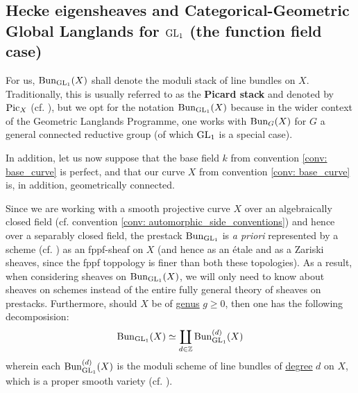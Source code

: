     \subsection{Hecke eigensheaves and Categorical-Geometric Global Langlands for \texorpdfstring{$\operatorname{GL}_1$}{} (the function field case)}
        \begin{convention} \label{conv: automorphic_side_conventions}
            For us, $\mathrm{Bun}_{\operatorname{GL}_1}(X)$ shall denote the moduli stack of line bundles on $X$. Traditionally, this is usually referred to as the \textbf{Picard stack} and denoted by $\mathrm{Pic}_X$ (cf. \cite[\href{https://stacks.math.columbia.edu/tag/0372}{Tag 0372}]{stacks}), but we opt for the notation $\mathrm{Bun}_{\operatorname{GL}_1}(X)$ because in the wider context of the Geometric Langlands Programme, one works with $\mathrm{Bun}_G(X)$ for $G$ a general connected reductive group (of which $\operatorname{GL}_1$ is a special case). 
            
            In addition, let us now suppose that the base field $k$ from convention \ref{conv: base_curve} is perfect, and that our curve $X$ from convention \ref{conv: base_curve} is, in addition, geometrically connected.
        \end{convention}
        \begin{remark} \label{remark: geometry_of_the_picard_stack}
            Since we are working with a smooth projective curve $X$ over an algebraically closed field (cf. convention \ref{conv: automorphic_side_conventions}) and hence over a separably closed field, the prestack $\mathrm{Bun}_{\operatorname{GL}_1}$ is \textit{a priori} represented by a scheme (cf. \cite[\href{https://stacks.math.columbia.edu/tag/0B9Z}{Tag 0B9Z}]{stacks}) as an fppf-sheaf on $X$ (and hence as an \'etale and as a Zariski sheaves, since the fppf toppology is finer than both these topologies). As a result, when considering sheaves on $\mathrm{Bun}_{\operatorname{GL}_1}(X)$, we will only need to know about sheaves on schemes instead of the entire fully general theory of sheaves on prestacks. Furthermore, should $X$ be of \href{https://stacks.math.columbia.edu/tag/0BY6}{\underline{genus}} $g \geq 0$, then one has the following decomposision:
                $$\mathrm{Bun}_{\operatorname{GL}_1}(X) \simeq \coprod_{d \in \mathbb{Z}} \mathrm{Bun}_{\operatorname{GL}_1}^{(d)}(X)$$
            wherein each $\mathrm{Bun}_{\operatorname{GL}_1}^{(d)}(X)$ is the moduli scheme of line bundles of \href{https://stacks.math.columbia.edu/tag/0AYQ}{\underline{degree}} $d$ on $X$, which is a proper smooth variety (cf. \cite[\href{https://stacks.math.columbia.edu/tag/0BA0}{Tag 0BA0}]{stacks}).
        \end{remark}
        
